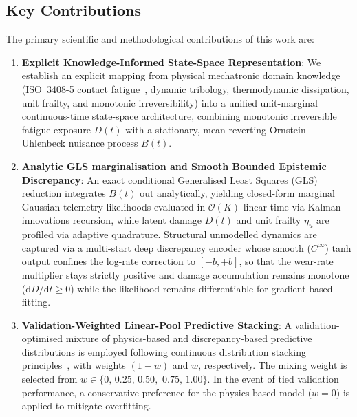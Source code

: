 \documentclass[a4paper,fleqn]{cas-dc}
\begin{document}
\subsection{Key Contributions}
\label{subsec:contributions}

The primary scientific and methodological contributions of this work are:
\begin{enumerate}[label=\textbf{C\arabic*.},leftmargin=2.5em]
    \item \textbf{Explicit Knowledge-Informed State-Space Representation}: We establish an explicit mapping from physical mechatronic domain knowledge (ISO~3408-5 contact fatigue~\cite{ISO_3408_5}, dynamic tribology, thermodynamic dissipation, unit frailty, and monotonic irreversibility) into a unified unit-marginal continuous-time state-space architecture, combining monotonic irreversible fatigue exposure $D(t)$ with a stationary, mean-reverting Ornstein-Uhlenbeck nuisance process $B(t)$.
    \item \textbf{Analytic GLS marginalisation and Smooth Bounded Epistemic Discrepancy}: An exact conditional Generalised Least Squares (GLS) reduction integrates $B(t)$ out analytically, yielding closed-form marginal Gaussian telemetry likelihoods evaluated in $\mathcal{O}(K)$ linear time via Kalman innovations recursion, while latent damage $D(t)$ and unit frailty $\eta_u$ are profiled via adaptive quadrature. Structural unmodelled dynamics are captured via a multi-start deep discrepancy encoder whose smooth ($C^\infty$) tanh output confines the log-rate correction to $[-b, +b]$, so that the wear-rate multiplier stays strictly positive and damage accumulation remains monotone ($\mathrm{d}D/\mathrm{d}t \ge 0$) while the likelihood remains differentiable for gradient-based fitting.
    
    \item \textbf{Validation-Weighted Linear-Pool Predictive Stacking}: A validation-optimised mixture of physics-based and discrepancy-based predictive distributions is employed following continuous distribution stacking principles~\cite{Yao_2018}, with weights $(1-w)$ and $w$, respectively. The mixing weight is selected from $w \in \{0,\,0.25,\,0.50,$ $0.75,\,1.00\}$. In the event of tied validation performance, a conservative preference for the physics-based model ($w=0$) is applied to mitigate overfitting.


\end{enumerate}
\end{document}
